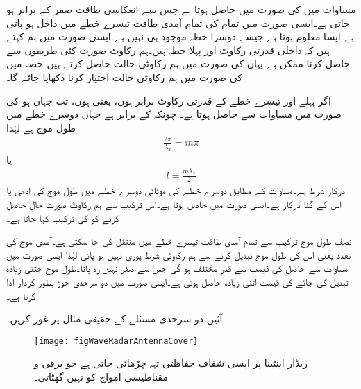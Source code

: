 مساوات  میں  کی صورت میں  حاصل  ہوتا ہے جس سے انعکاسی طاقت صفر کے برابر ہو جاتی ہے۔ایسی صورت میں تمام کی تمام آمدی طاقت تیسرے خطے میں داخل ہو پاتی ہے۔ایسا معلوم ہوتا ہے جیسے دوسرا خطہ موجود ہی نہیں ہے۔ایسی صورت میں ہم کہتے ہیں کہ داخلی قدرتی رکاوٹ اور پہلا خطہ  ہیں۔ہم رکاوٹ صورت کئی طریقوں سے حاصل کرنا ممکن ہے۔یہاں  کی صورت میں ہم رکاوٹی حالت حاصل کرتے ہیں۔حصہ  میں  کی صورت میں ہم رکاوٹی حالت اختیار کرنا دکھایا جائے گا۔

اگر پہلے اور تیسرے خطے کے قدرتی رکاوٹ برابر ہوں، یعنی  ہوں، تب  جہاں  ہو کی صورت میں مساوات  سے   حاصل ہوتا ہے۔ چونکہ  کے برابر ہے جہاں  دوسرے خطے میں طول موج ہے لہٰذا
\begin{align*}
\frac{2 \pi}{\lambda_2}=m \pi
\end{align*}
یا
\begin{align}\label{مساوات_مستوی_دو_سرحدی_ہم_رکاوٹ_شرط}
l=\frac{m \lambda_2}{2}
\end{align}
درکار شرط ہے۔مساوات  کے مطابق دوسرے خطے کی موٹائی دوسرے خطے میں طول موج کی آدھی یا اس کے  گنا درکار ہے۔ایسی صورت میں  حاصل ہوتا ہے۔اس ترکیب سے ہم رکاوٹ صورت حال حاصل کرنے کو  کی ترکیب کہا جاتا ہے۔

نصف طول موج ترکیب سے تمام آمدی طاقت تیسرے خطے میں منتقل کی جا سکتی ہے۔آمدی موج کی تعدد یعنی اس کی طول موج تبدیل کرنے سے ہم رکاوٹی شرط پوری نہیں ہو پاتی لہٰذا ایسی صورت میں مساوات  سے حاصل  کی قیمت  سے قدر مختلف ہو گی جس سے  صفر نہیں رہ پاتا۔طول موج جتنی زیادہ تبدیل کی جائے  کی قیمت اتنی زیادہ حاصل ہوتی ہے۔ایسی صورت میں دو سرحدی جوڑ بطور  کردار ادا کرتا ہے۔

آئیں دو سرحدی مسئلے کے حقیقی مثال پر غور کریں۔

\begin{figure}
\centering
\texttt{[image: figWaveRadarAntennaCover]}
\caption{ریڈار اینٹینا پر ایسی شفاف حفاظتی تہہ چڑھائی جاتی ہے جو برقی و مقناطیسی امواج کو نہیں گھٹاتی۔}
\label{شکل_موج_ریڈار_اینٹینا_تہہ}
\end{figure}

